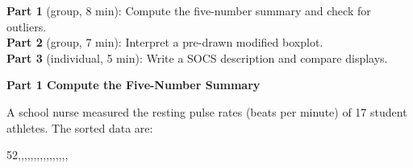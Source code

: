 \documentclass[10pt]{article}
\begin{document}
\namepartnerperiod

\vspace{0.10in}

\begin{tcolorbox}[colback=sky, colframe=navy, boxrule=0.8pt, arc=2mm,
    left=3mm, right=3mm, top=2mm, bottom=2mm]
\small
\textbf{Part 1} (group, 8 min): Compute the five-number summary and check for
outliers.\\
\textbf{Part 2} (group, 7 min): Interpret a pre-drawn modified boxplot.\\
\textbf{Part 3} (individual, 5 min): Write a SOCS description and compare
displays.
\end{tcolorbox}

\vspace{0.10in}

{\large\bfseries\color{navy} Part 1 \quad Compute the Five-Number Summary}

\vspace{0.10in}

\noindent\small A school nurse measured the resting pulse rates (beats per minute)
of 17 student athletes. The sorted data are:

\vspace{0.08in}
\begin{center}
\small
52,,,,,,,,,,,,,,,,
\end{center}

\vspace{0.12in}
\end{document}
